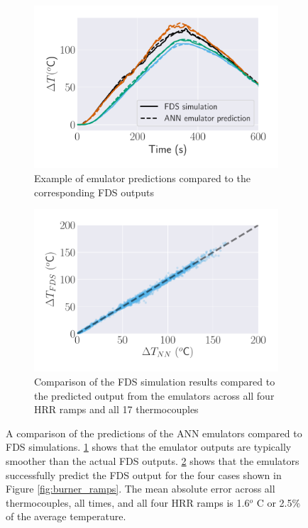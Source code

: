 \documentclass{article}
\begin{document}
\begin{figure}[htbp]
  \centering
  \begin{subfigure}[t]{.45\textwidth}
      \centering
      \includegraphics[width=\textwidth,keepaspectratio]{figures/forward_NN_examples.pdf}
      \caption{Example of emulator predictions compared to the corresponding FDS outputs}
      \label{fig:forward_NN_examples}
  \end{subfigure}
  \begin{subfigure}[t]{.45\textwidth}
      \centering
      \includegraphics[width=\textwidth ,keepaspectratio]{figures/forward_error_scatter.pdf}
      \caption{Comparison of the FDS simulation results compared to the predicted output from the emulators across all four HRR ramps and all 17 thermocouples }
      \label{fig:forward_error_scatter}
  \end{subfigure}
  \caption{A comparison of the predictions of the ANN emulators compared to FDS simulations. \protect\ref{fig:forward_NN_examples} shows that the emulator outputs are typically smoother than the actual FDS outputs. \protect\ref{fig:forward_error_scatter} shows that the emulators successfully predict the FDS output for the four cases shown in Figure \protect\ref{fig:burner_ramps}. The mean absolute error across all thermocouples, all times, and all four HRR ramps is 1.6$^o$ C or 2.5\% of the average temperature.}
  \label{fig:forward_error}
\end{figure}
\end{document}
